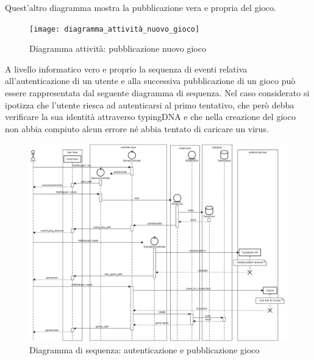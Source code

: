\FloatBarrier
Quest'altro diagramma mostra la pubblicazione vera e propria del gioco.\\
\begin{figure}[hbt!]
    \centering
    \texttt{[image: diagramma\_attività\_nuovo\_gioco]}
    \caption{Diagramma attività: pubblicazione nuovo gioco}
\end{figure}
\FloatBarrier
A livello informatico vero e proprio la sequenza di eventi relativa all'autenticazione di un utente e alla successiva pubblicazione di un gioco può essere rappresentata dal seguente diagramma di sequenza. Nel caso considerato si ipotizza che l'utente riesca ad autenticarsi al primo tentativo, che però debba verificare la sua identità attraverso typingDNA e che nella creazione del gioco non abbia compiuto alcun errore né abbia tentato di caricare un virus.\\
\begin{figure}
    \centering
    \includegraphics[width=1.2\textwidth]{new_game_sequence_diagram}
    \caption{Diagramma di sequenza: autenticazione e pubblicazione gioco}
\end{figure}